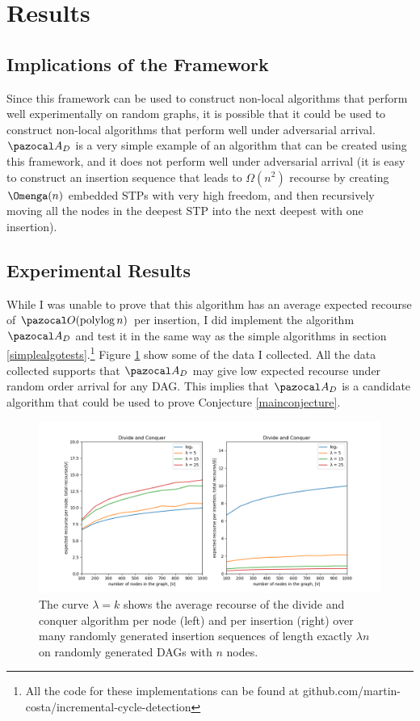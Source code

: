 \documentclass{report}
\DeclareMathOperator*{\polylog}{polylog}
\begin{document}
\section{Results}

\subsection{Implications of the Framework}

Since this framework can be used to construct non-local algorithms that perform well experimentally on random graphs, it is possible that it could be used to construct non-local algorithms that perform well under adversarial arrival. $\pazocal A_D$ is a very simple example of an algorithm that can be created using this framework, and it does not perform well under adversarial arrival (it is easy to construct an insertion sequence that leads to $\Omega(n^2)$ recourse by creating $\Omenga(n)$ embedded STPs with very high freedom, and then recursively moving all the nodes in the deepest STP into the next deepest with one insertion).

\subsection{Experimental Results}

While I was unable to prove that this algorithm has an average expected recourse of $\pazocal O(\polylog n)$ per insertion, I did implement the algorithm $\pazocal A_D$ and test it in the same way as the simple algorithms in section \ref{simplealgotests}.\footnote{All the code for these implementations can be found at github.com/martin-costa/incremental-cycle-detection} Figure \ref{fig:recoursetests2} show some of the data I collected. All the data collected supports that $\pazocal A_D$ may give low expected recourse under random order arrival for any DAG. This implies that $\pazocal A_D$ is a candidate algorithm that could be used to prove Conjecture \ref{mainconjecture}.

\begin{figure}[htp]
    \centering
    \centerline{\includegraphics[width=18cm]{Images/DnCtests.png}}
    \caption{The curve $\lambda = k$ shows the average recourse of the divide and conquer algorithm per node (left) and per insertion (right) over many randomly generated insertion sequences of length exactly $\lambda n$ on randomly generated DAGs with $n$ nodes.}
    \label{fig:recoursetests2}
\end{figure}
\end{document}
